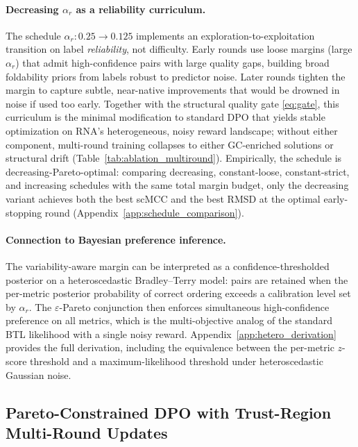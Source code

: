 \paragraph{Decreasing $\alpha_r$ as a reliability curriculum.}
The schedule $\alpha_r: 0.25 \to 0.125$ implements an exploration-to-exploitation transition on label \emph{reliability}, not difficulty. Early rounds use loose margins (large $\alpha_r$) that admit high-confidence pairs with large quality gaps, building broad foldability priors from labels robust to predictor noise. Later rounds tighten the margin to capture subtle, near-native improvements that would be drowned in noise if used too early. Together with the structural quality gate \eqref{eq:gate}, this curriculum is the minimal modification to standard DPO that yields stable optimization on RNA's heterogeneous, noisy reward landscape; without either component, multi-round training collapses to either GC-enriched solutions or structural drift (Table~\ref{tab:ablation_multiround}). Empirically, the schedule is decreasing-Pareto-optimal: comparing decreasing, constant-loose, constant-strict, and increasing schedules with the same total margin budget, only the decreasing variant achieves both the best scMCC and the best RMSD at the optimal early-stopping round (Appendix~\ref{app:schedule_comparison}).

\paragraph{Connection to Bayesian preference inference.}
The variability-aware margin can be interpreted as a confidence-thresholded posterior on a heteroscedastic Bradley--Terry model: pairs are retained when the per-metric posterior probability of correct ordering exceeds a calibration level set by $\alpha_r$. The $\varepsilon$-Pareto conjunction then enforces simultaneous high-confidence preference on all metrics, which is the multi-objective analog of the standard BTL likelihood with a single noisy reward. Appendix~\ref{app:hetero_derivation} provides the full derivation, including the equivalence between the per-metric $z$-score threshold and a maximum-likelihood threshold under heteroscedastic Gaussian noise.


\subsection{Pareto-Constrained DPO with Trust-Region Multi-Round Updates}
\label{subsec:rlpf_dpo}

